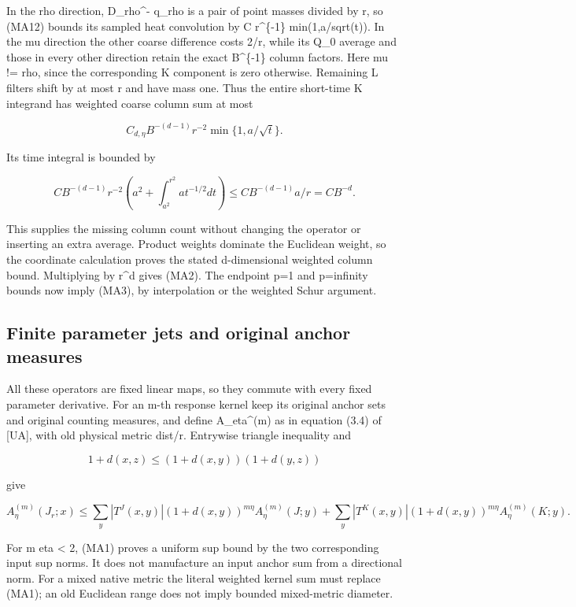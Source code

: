 \documentclass[
  11pt,
]{article}
\begin{document}
In the rho direction, D\_rho\^{}- q\_rho is a pair of point masses
divided by r, so (MA12) bounds its sampled heat convolution by C
r\^{}\{-1\} min(1,a/sqrt(t)). In the mu direction the other coarse
difference costs 2/r, while its Q\_0 average and those in every other
direction retain the exact B\^{}\{-1\} column factors. Here mu != rho,
since the corresponding K component is zero otherwise. Remaining L
filters shift by at most r and have mass one. Thus the entire short-time
K integrand has weighted coarse column sum at most

\[
C_{d,\eta}B^{-(d-1)}r^{-2}\min\{1,a/\sqrt t\}.
\]

Its time integral is bounded by

\[
C B^{-(d-1)}r^{-2}\left(a^2+\int_{a^2}^{r^2}a t^{-1/2}dt\right)
\le C B^{-(d-1)}a/r=C B^{-d}.
\]

This supplies the missing column count without changing the operator or
inserting an extra average. Product weights dominate the Euclidean
weight, so the coordinate calculation proves the stated d-dimensional
weighted column bound. Multiplying by r\^{}d gives (MA2). The endpoint
p=1 and p=infinity bounds now imply (MA3), by interpolation or the
weighted Schur argument.

\hypertarget{finite-parameter-jets-and-original-anchor-measures}{%
\subsection{Finite parameter jets and original anchor
measures}\label{finite-parameter-jets-and-original-anchor-measures}}

All these operators are fixed linear maps, so they commute with every
fixed parameter derivative. For an m-th response kernel keep its
original anchor sets and original counting measures, and define
A\_eta\^{}(m) as in equation (3.4) of [UA], with old physical metric dist/r.
Entrywise triangle inequality and

\[
1+d(x,z)\le(1+d(x,y))(1+d(y,z))
\]

give

\[
A_\eta^{(m)}(J_r;x)
\le\sum_y |T^J(x,y)|(1+d(x,y))^{m\eta}A_\eta^{(m)}(J;y)
 +\sum_y |T^K(x,y)|(1+d(x,y))^{m\eta}A_\eta^{(m)}(K;y).
\tag{MA11}
\]

For m eta \textless{} 2, (MA1) proves a uniform sup bound by the two
corresponding input sup norms. It does not manufacture an input anchor
sum from a directional norm. For a mixed native metric the literal
weighted kernel sum must replace (MA1); an old Euclidean range does not
imply bounded mixed-metric diameter.
\end{document}
